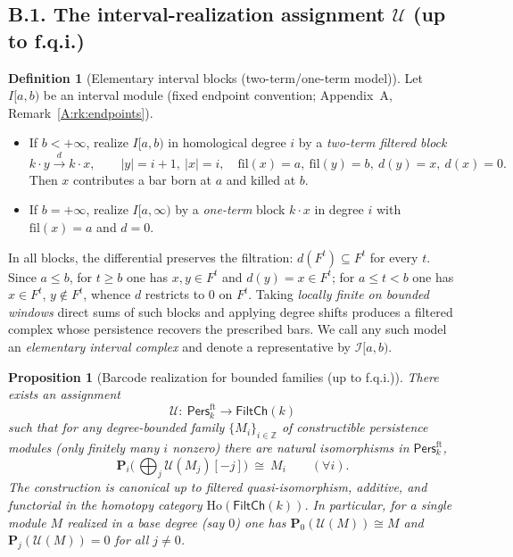 \documentclass[11pt]{article}
\newcommand{\Pers}{\mathsf{Pers}}
\newcommand{\Ho}{\mathrm{Ho}}
\numberwithin{equation}{section}
\newtheorem{proposition}[theorem]{Proposition}
\theoremstyle{definition}
\newtheorem{definition}[theorem]{Definition}
\begin{document}
\subsection*{B.1. The interval-realization assignment \texorpdfstring{$\mathcal{U}$}{U} (up to f.q.i.)}
\begin{definition}[Elementary interval blocks (two-term/one-term model)]
Let \(I[a,b)\) be an interval module (fixed endpoint convention; Appendix~A, Remark~\ref{A:rk:endpoints}).
\begin{itemize}
  \item If \(b<+\infty\), realize \(I[a,b)\) in homological degree \(i\) by a \emph{two-term filtered block}
  \[
    k\cdot y \xrightarrow{\,d\,} k\cdot x,\qquad |y|=i+1,\ |x|=i,\quad
      \mathrm{fil}(x)=a,\ \mathrm{fil}(y)=b,\ d(y)=x,\ d(x)=0.
  \]
  Then \(x\) contributes a bar born at \(a\) and killed at \(b\).
  \item If \(b=+\infty\), realize \(I[a,\infty)\) by a \emph{one-term} block \(k\cdot x\) in degree \(i\) with \(\mathrm{fil}(x)=a\) and \(d=0\).
\end{itemize}
In all blocks, the differential preserves the filtration: \(d(F^t)\subseteq F^t\) for every \(t\).
Since \(a\le b\), for \(t\ge b\) one has \(x,y\in F^t\) and \(d(y)=x\in F^t\); for \(a\le t<b\) one has \(x\in F^t\), \(y\notin F^t\), whence \(d\) restricts to \(0\) on \(F^t\).
Taking \emph{locally finite on bounded windows} direct sums of such blocks and applying degree shifts produces a filtered complex whose persistence recovers the prescribed bars.
We call any such model an \emph{elementary interval complex} and denote a representative by \(\mathcal{I}[a,b)\).
\end{definition}

\begin{proposition}[Barcode realization for bounded families (up to f.q.i.)]\label{B:prop:U}
There exists an assignment
\[
\mathcal{U}:\ \Pers^{\mathrm{ft}}_k\longrightarrow \mathsf{FiltCh}(k)
\]
such that for any \emph{degree-bounded} family \(\{M_i\}_{i\in\mathbb{Z}}\) of constructible persistence modules
(only finitely many \(i\) nonzero) there are natural isomorphisms in \(\Pers^{\mathrm{ft}}_k\),
\[
\mathbf{P}_i\!\Big(\,\bigoplus_{j}\mathcal{U}(M_j)[-j]\Big)\ \cong\ M_i\qquad(\forall i).
\]
The construction is canonical \emph{up to} filtered quasi-isomorphism, additive, and functorial in the homotopy category \(\Ho(\mathsf{FiltCh}(k))\).
In particular, for a single module \(M\) realized in a base degree (say \(0\)) one has \(\mathbf{P}_0(\mathcal{U}(M))\cong M\) and \(\mathbf{P}_j(\mathcal{U}(M))=0\) for all \(j\neq 0\).
\end{proposition}
\end{document}

